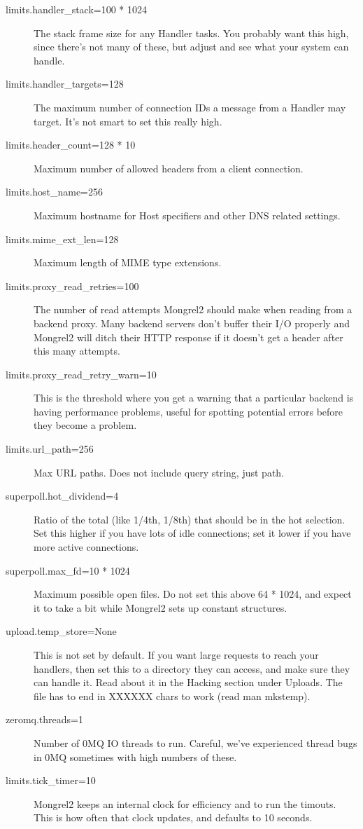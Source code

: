 \begin{description}
\item[limits.handler\_stack=100 * 1024] The stack frame size for any Handler tasks. You probably want this high, since there's not many of these, but adjust and see what your system can handle.
\item[limits.handler\_targets=128] The maximum number of connection IDs a message from a Handler may target.  It's not smart to set this really high.
\item[limits.header\_count=128 * 10] Maximum number of allowed headers from a client connection.
\item[limits.host\_name=256] Maximum hostname for Host specifiers and other DNS related settings.
\item[limits.mime\_ext\_len=128] Maximum length of MIME type extensions.
\item[limits.proxy\_read\_retries=100] The number of read attempts Mongrel2 should make when reading from a backend proxy. Many backend servers don't buffer their I/O properly and Mongrel2 will ditch their HTTP response if it doesn't get a header after this many attempts.
\item[limits.proxy\_read\_retry\_warn=10] This is the threshold where you get a warning that a particular backend is having performance problems, useful for spotting potential errors before they become a problem.
\item[limits.url\_path=256] Max URL paths. Does not include query string, just path.
\item[superpoll.hot\_dividend=4] Ratio of the total (like 1/4th, 1/8th) that should be in the hot selection.  Set this higher if you have lots of idle connections; set it lower if you have more active connections.
\item[superpoll.max\_fd=10 * 1024] Maximum possible open files.  Do not set this above 64 * 1024, and expect it to take a bit while Mongrel2 sets up constant structures.
\item[upload.temp\_store=None] This is not set by default.  If you want large requests to reach your handlers, then set this to a directory they can access, and make sure they can handle it.  Read about it in the Hacking section under Uploads.  The file has to end in XXXXXX chars to work (read man mkstemp).
\item[zeromq.threads=1] Number of 0MQ IO threads to run.  Careful, we've experienced thread bugs in 0MQ sometimes with high numbers of these.

\item[limits.tick\_timer=10] Mongrel2 keeps an internal clock for efficiency and to run the
timouts.  This is how often that clock updates, and defaults to 10 seconds.


\end{description}
